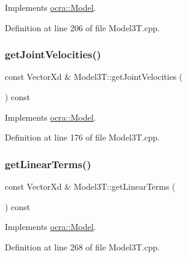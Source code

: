 Implements \hyperlink{classocra_1_1Model_a75caa887c8f27d8be8dc5a60ed1e1c41}{ocra\+::\+Model}.



Definition at line 206 of file Model3\+T.\+cpp.

\hypertarget{classModel3T_adb503d550d97093a65f19e55725865ca}{}\label{classModel3T_adb503d550d97093a65f19e55725865ca} 
\subsubsection{\texorpdfstring{get\+Joint\+Velocities()}{getJointVelocities()}}
{\footnotesize\ttfamily const Vector\+Xd \& Model3\+T\+::get\+Joint\+Velocities (\begin{DoxyParamCaption}{ }\end{DoxyParamCaption}) const\hspace{0.3cm}{\ttfamily [virtual]}}



Implements \hyperlink{classocra_1_1Model_a73b9bd94e98138145217526dbe23841a}{ocra\+::\+Model}.



Definition at line 176 of file Model3\+T.\+cpp.

\hypertarget{classModel3T_a82b4a52bc8bf966a57a31e54e3efb80c}{}\label{classModel3T_a82b4a52bc8bf966a57a31e54e3efb80c} 
\subsubsection{\texorpdfstring{get\+Linear\+Terms()}{getLinearTerms()}}
{\footnotesize\ttfamily const Vector\+Xd \& Model3\+T\+::get\+Linear\+Terms (\begin{DoxyParamCaption}{ }\end{DoxyParamCaption}) const\hspace{0.3cm}{\ttfamily [virtual]}}



Implements \hyperlink{classocra_1_1Model_a0f9c628cb9e77d63744ccfd164e9beed}{ocra\+::\+Model}.



Definition at line 268 of file Model3\+T.\+cpp.

\hypertarget{classModel3T_a226c740338e57180fafed23181d1ca85}{}\label{classModel3T_a226c740338e57180fafed23181d1ca85} 
